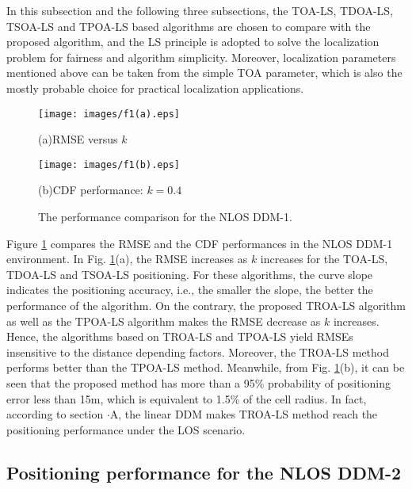\documentclass[journal]{IEEEtran}
\begin{document}
In this subsection and the following three subsections, the TOA-LS, TDOA-LS, TSOA-LS and TPOA-LS based algorithms are chosen to compare with the proposed algorithm, and the LS principle is adopted to solve the localization problem for fairness and algorithm simplicity. Moreover, localization parameters mentioned above can be taken from the simple TOA parameter, which is also the mostly probable choice for practical localization applications.
\begin{figure}[htb!]
   \centering
   \begin{minipage}{0.3\textwidth}
       \centering
       \texttt{[image: images/f1(a).eps]}
       \caption*{(a)\quad RMSE versus $k$}
   \end{minipage}
   \vspace{0.5cm} %
   \begin{minipage}{0.3\textwidth}
       \centering
       \texttt{[image: images/f1(b).eps]}
       \caption*{(b)\quad CDF performance: $k=0.4$}
   \end{minipage}
   \vspace{-0.5cm}
   \caption{The performance comparison for the NLOS DDM-1.}
   \label{fig:Fig7}
\end{figure}

Figure \ref{fig:Fig7} compares the RMSE and the CDF performances in the NLOS DDM-1 environment. In Fig. \ref{fig:Fig7}(a), the RMSE increases as $k$ increases for the TOA-LS, TDOA-LS and TSOA-LS positioning. For these algorithms, the curve slope indicates the positioning accuracy, i.e., the smaller the slope, the better the performance of the algorithm. On the contrary, the proposed TROA-LS algorithm as well as the TPOA-LS algorithm makes the RMSE decrease as $k$ increases. Hence, the algorithms based on TROA-LS and TPOA-LS yield RMSEs insensitive to the distance depending factors. Moreover, the TROA-LS method performs better than the TPOA-LS method. Meanwhile, from Fig. \ref{fig:Fig7}(b), it can be seen that the proposed method has more than a 95\% probability of positioning error less than 15m, which is equivalent to 1.5\% of the cell radius. In fact, according to section \uppercase\expandafter{}${\cdot}$A, the linear DDM makes TROA-LS method reach the positioning performance under the LOS scenario.

\subsection{Positioning performance for the NLOS DDM-2}
\end{document}
